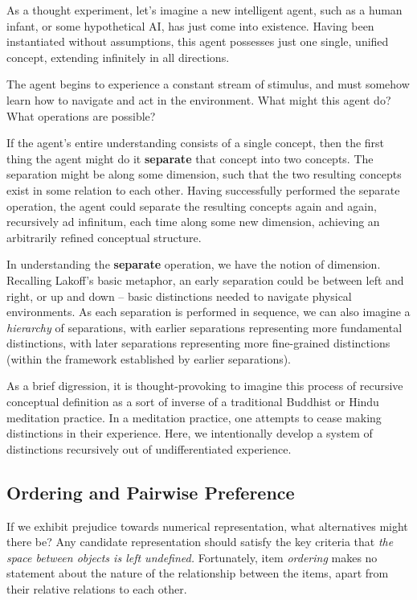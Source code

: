 As a thought experiment, let's imagine a new intelligent agent, such as a human infant, or some hypothetical AI, has just come into existence.
Having been instantiated without assumptions, this agent possesses just one single, unified concept, extending infinitely in all directions.

The agent begins to experience a constant stream of stimulus, and must somehow learn how to navigate and act in the environment. What might this agent do? What operations are possible?

If the agent's entire understanding consists of a single concept, then the first thing the agent might do it \textbf{separate} that concept into two concepts.
The separation might be along some dimension, such that the two resulting concepts exist in some relation to each other.
Having successfully performed the separate operation, the agent could separate the resulting concepts again and again, recursively ad infinitum, each time along some new dimension, achieving an arbitrarily refined conceptual structure.

In understanding the \textbf{separate} operation, we have the notion of dimension.
Recalling Lakoff's basic metaphor, an early separation could be between left and right, or up and down -- basic distinctions needed to navigate physical environments.
As each separation is performed in sequence, we can also imagine a \textit{hierarchy} of separations, with earlier separations representing more fundamental distinctions, with later separations representing more fine-grained distinctions (within the framework established by earlier separations).

As a brief digression, it is thought-provoking to imagine this process of recursive conceptual definition as a sort of inverse of a traditional Buddhist or Hindu meditation practice.
In a meditation practice, one attempts to cease making distinctions in their experience. Here, we intentionally develop a system of distinctions recursively out of undifferentiated experience.


\subsection{Ordering and Pairwise Preference}

If we exhibit prejudice towards numerical representation, what alternatives might there be? Any candidate representation should satisfy the key criteria that \textit{the space between objects is left undefined.
}
Fortunately, item \textit{ordering} makes no statement about the nature of the relationship between the items, apart from their relative relations to each other.

